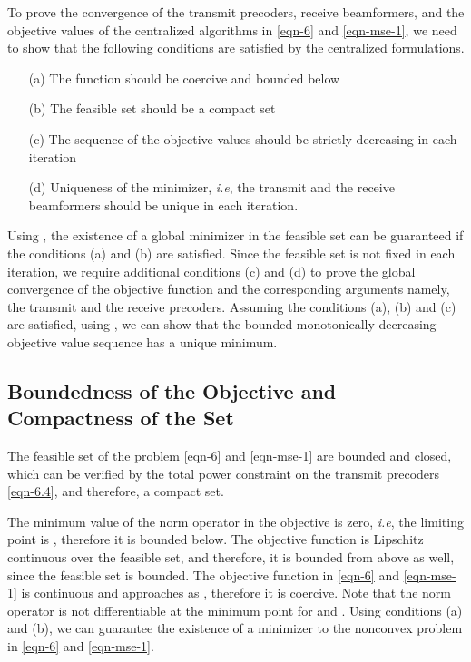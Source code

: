 \newcommand{\eqn}[1]{\(#1\)}
\newcommand{\mx}{\mbf{m}}
\newcommand{\my}{\mbf{w}}
\newcommand{\mz}{\mbfa{\gamma}}
\newcommand{\mxb}{{{\mbf{m}}}}
\newcommand{\myb}{{{\mbf{w}}}}
\newcommand{\iterate}[2]{{#1}^{(#2)}}
\newcommand{\iter}[3]{{#1}_{#2}^{(#3)}}
\newcommand{\ma}{\mbf{x}}

To prove the convergence of the transmit precoders, receive beamformers, and the objective values of the centralized algorithms in \eqref{eqn-6} and \eqref{eqn-mse-1}, we need to show that the following conditions are satisfied by the centralized formulations.
\begin{itemize}
	\item[(a)] The function should be coercive and bounded below
	\item[(b)] The feasible set should be a compact set
	\item[(c)] The sequence of the objective values should be strictly decreasing in each iteration
	\item[(d)] Uniqueness of the minimizer, \textit{i.e}, the transmit and the receive beamformers should be unique in each iteration.
\end{itemize}
Using \cite[Prop. A.8]{bertsekas1999nonlinear}, the existence of a global minimizer in the feasible set can be guaranteed if the conditions (a) and (b) are satisfied. Since the feasible set is not fixed in each iteration, we require additional conditions (c) and (d) to prove the global convergence of the objective function and the corresponding arguments namely, the transmit and the receive precoders. Assuming the conditions (a), (b) and (c) are satisfied, using \cite[Th. 3.14]{rudin1964principles}, we can show that the bounded monotonically decreasing objective value sequence has a unique minimum. 

\subsection{Boundedness of the Objective and Compactness of the Set}

The feasible set of the problem \eqref{eqn-6} and \eqref{eqn-mse-1} are bounded and closed, which can be verified by the total power constraint on the transmit precoders \eqref{eqn-6.4}, and therefore, a compact set. 

The minimum value of the norm operator in the objective is zero, \textit{i.e}, the limiting point is \me{< -\infty}, therefore it is bounded below. The objective function is Lipschitz continuous over the feasible set, and therefore, it is bounded from above as well, since the feasible set is bounded. The objective function in \eqref{eqn-6} and \eqref{eqn-mse-1} is continuous and approaches \me{\infty} as , therefore it is coercive. Note that the norm operator is not differentiable at the minimum point for  and . Using conditions (a) and (b), we can guarantee the existence of a minimizer to the nonconvex problem in \eqref{eqn-6} and \eqref{eqn-mse-1}.

